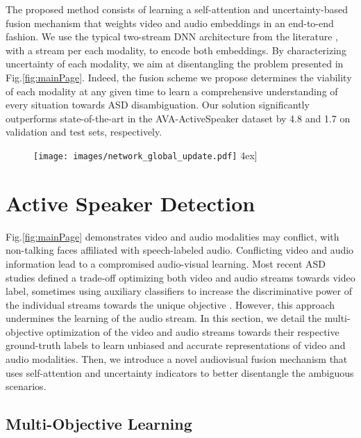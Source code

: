 \documentclass[a4paper]{article}
\begin{document}
The proposed method consists of learning a self-attention \cite{dot_product_self_attention} and uncertainty-based fusion mechanism that weights video and audio embeddings in an end-to-end fashion. We use the typical two-stream DNN architecture from the literature \cite{AVA, Alcazar_2020_CVPR}, with a stream per each modality, to encode both embeddings. By characterizing uncertainty of each modality, we aim at disentangling the problem presented in Fig.\ref{fig:mainPage}. Indeed, the fusion scheme we propose determines the viability of each modality at any given time to learn a comprehensive understanding of every situation towards ASD disambiguation. Our solution significantly outperforms state-of-the-art in the AVA-ActiveSpeaker dataset by 4.8 and 1.7 on validation and test sets, respectively.



\begin{figure}[t]
\centering
\texttt{[image: images/network\_global\_update.pdf]}
\label{network}
\-4ex]
\label{fig:network}
\end{figure}


\section{Active Speaker Detection} \label{ASD}

Fig.\ref{fig:mainPage} demonstrates video and audio modalities may conflict, with non-talking faces affiliated with speech-labeled audio. Conflicting video and audio information lead to a compromised audio-visual learning. Most recent ASD studies \cite{AVA, naver, Zhang2019MultiTask_3Dconv, Alcazar_2020_CVPR, optical_flow} defined a trade-off optimizing both video and audio streams towards video label, sometimes using auxiliary classifiers to increase the  discriminative power of the individual streams towards the unique objective \cite{AVA, Alcazar_2020_CVPR}. However, this approach undermines the learning of the audio stream. In this section, we detail the multi-objective optimization of the video and audio streams towards their respective ground-truth labels to learn unbiased and accurate representations of video and audio modalities. Then, we introduce a novel audiovisual fusion mechanism that uses self-attention and uncertainty indicators to better disentangle the ambiguous scenarios.





\subsection{Multi-Objective Learning} \label{problem_formulation}
\end{document}
